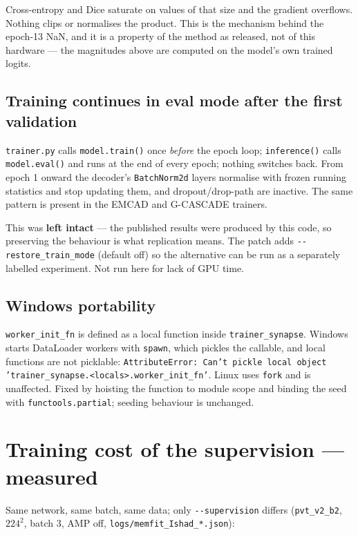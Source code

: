\documentclass[11pt,a4paper]{article}
\newcommand{\code}[1]{\texttt{\small #1}}
\begin{document}
Cross-entropy and Dice saturate on values of that size and the gradient
overflows. Nothing clips or normalises the product. This is the mechanism behind
the epoch-13 NaN, and it is a property of the method as released, not of this
hardware --- the magnitudes above are computed on the model's own trained
logits.

\subsection{Training continues in eval mode after the first validation}

\code{trainer.py} calls \code{model.train()} once \emph{before} the epoch loop;
\code{inference()} calls \code{model.eval()} and runs at the end of every epoch;
nothing switches back. From epoch 1 onward the decoder's \code{BatchNorm2d}
layers normalise with frozen running statistics and stop updating them, and
dropout/drop-path are inactive. The same pattern is present in the EMCAD and
G-CASCADE trainers.

This was \textbf{left intact} --- the published results were produced by this
code, so preserving the behaviour is what replication means. The patch adds
\code{-{}-restore\_train\_mode} (default off) so the alternative can be run as a
separately labelled experiment. Not run here for lack of GPU time.

\subsection{Windows portability}

\code{worker\_init\_fn} is defined as a local function inside
\code{trainer\_synapse}. Windows starts DataLoader workers with \code{spawn},
which pickles the callable, and local functions are not picklable:
\code{AttributeError: Can't pickle local object
'trainer\_synapse.<locals>.worker\_init\_fn'}. Linux uses \code{fork} and is
unaffected. Fixed by hoisting the function to module scope and binding the seed
with \code{functools.partial}; seeding behaviour is unchanged.

\section{Training cost of the supervision --- measured}

Same network, same batch, same data; only \code{-{}-supervision} differs
(\code{pvt\_v2\_b2}, $224^2$, batch 3, AMP off, \code{logs/memfit\_Ishad\_*.json}):
\end{document}
